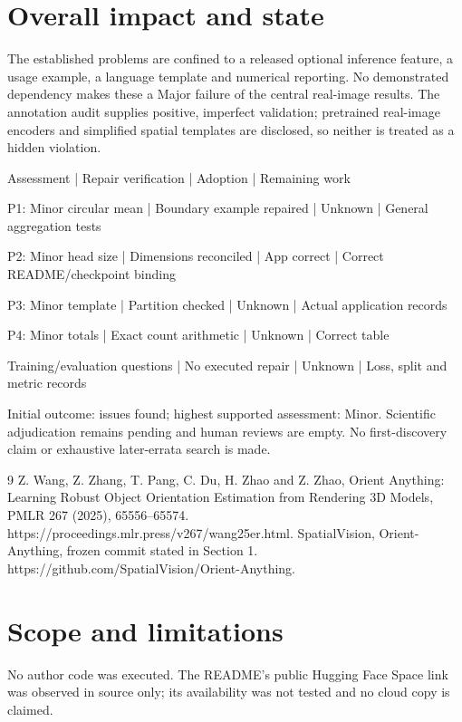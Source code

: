 \documentclass[10pt]{article}
\begin{document}
\section*{Overall impact and state}
The established problems are confined to a released optional inference feature, a usage example, a language template and numerical reporting. No demonstrated dependency makes these a Major failure of the central real-image results. The annotation audit supplies positive, imperfect validation; pretrained real-image encoders and simplified spatial templates are disclosed, so neither is treated as a hidden violation.\par
Assessment | Repair verification | Adoption | Remaining work\par
P1: Minor circular mean | Boundary example repaired | Unknown | General aggregation tests\par
P2: Minor head size | Dimensions reconciled | App correct | Correct README/checkpoint binding\par
P3: Minor template | Partition checked | Unknown | Actual application records\par
P4: Minor totals | Exact count arithmetic | Unknown | Correct table\par
Training/evaluation questions | No executed repair | Unknown | Loss, split and metric records\par
Initial outcome: issues found; highest supported assessment: Minor. Scientific adjudication remains pending and human reviews are empty. No first-discovery claim or exhaustive later-errata search is made.\par
9 Z. Wang, Z. Zhang, T. Pang, C. Du, H. Zhao and Z. Zhao, Orient Anything: Learning Robust Object Orientation Estimation from Rendering 3D Models, PMLR 267 (2025), 65556–65574. https://proceedings.mlr.press/v267/wang25er.html. SpatialVision, Orient-Anything, frozen commit stated in Section 1. https://github.com/SpatialVision/Orient-Anything.\par
\section*{Scope and limitations}
No author code was executed. The README’s public Hugging Face Space link was observed in source only; its availability was not tested and no cloud copy is claimed.\par
\end{document}
